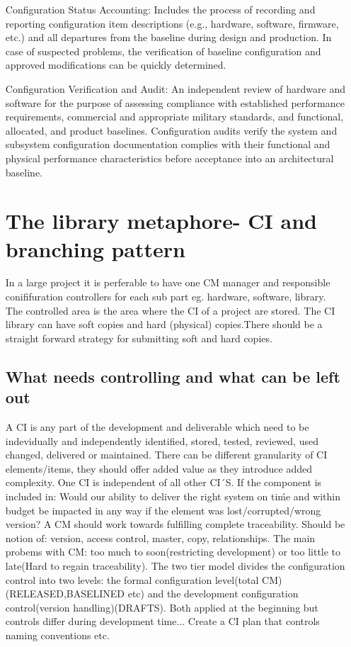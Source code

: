 \documentclass{article}
\begin{document}
\begin{itemize}
\begin{itemize}
\begin{itemize}
    \item[ Configuration Status Accounting:] Includes the process of recording and reporting configuration item descriptions (e.g., hardware, software, firmware, etc.) and all departures
    from the baseline during design and production. In case of suspected problems, the verification of baseline configuration and approved modifications can be quickly determined.
    \item[Configuration Verification and Audit:] An independent review of hardware and software for the purpose of assessing compliance with established performance requirements,
    commercial and appropriate military standards, and functional, allocated, and product baselines. Configuration audits verify the system and subsystem configuration documentation
    complies with their functional and physical performance characteristics before acceptance into an architectural baseline.

    \section{The library metaphore- CI and branching pattern}
    In a large project it is perferable to have one CM manager and responsible conififuration controllers for each sub part eg. hardware, software, library. The controlled area is the area
    where the CI of a project are stored. The CI library can have soft copies and hard (physical) copies.There should be a straight forward strategy for submitting soft and hard copies.
    \subsection{What needs controlling and what can be left out}
    A CI is any part of the development and deliverable which need to be indevidually and independently identified, stored, tested, reviewed, used changed, delivered or maintained. There can be different 
    granularity of CI elements/items, they should offer added value as they introduce added complexity. One CI is independent of all other CI´S.
    If the component is included in: Would our ability to deliver the right system on tiḿe and within budget be impacted in any way if the element was lost/corrupted/wrong version? 
    A CM should work towards fulfilling complete traceability. Should be notion of: version, access control, master, copy, relationships.
    The main probems with CM: too much to soon(restricting development) or too little to late(Hard to regain traceability). The two tier model divides the configuration control into two levels:
    the formal configuration level(total CM)(RELEASED,BASELINED etc) and the development configuration control(version handling)(DRAFTS). Both applied at the beginning but controls differ during development time... 
    Create a CI plan that controls naming conventions etc. 

\end{itemize}
\end{itemize}
\end{itemize}
\end{document}
